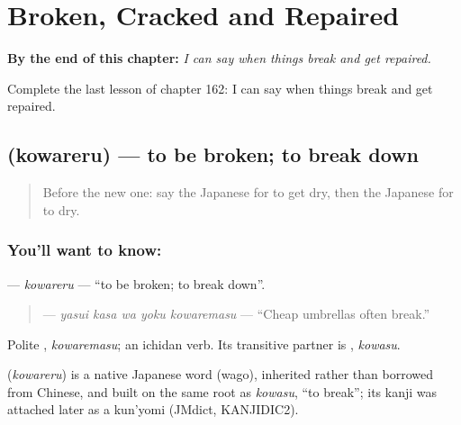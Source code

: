 
\chapter{Broken, Cracked and Repaired}
\label{ch:ja-broken-cracked-and-repaired}

\begin{chapteropening}
\textbf{By the end of this chapter:} \emph{I can say when things break and get repaired.}

Complete the last lesson of chapter 162: I can say when things break and get repaired.
\end{chapteropening}

\section[\texorpdfstring{\ja{こわれる} (kowareru)}{こわれる (kowareru)}]{ (kowareru) — to be broken; to break down}

\label{lesson:JA-C162-kowareru}



\begin{quote}
Before the new one: say the Japanese for to get dry, then the Japanese for to dry.
\end{quote}

\subsection*{You'll want to know: }
\textbf{} — \emph{kowareru} — \textquotedblleft{}to be broken; to break down\textquotedblright{}.

\begin{quote}
\textbf{   } — \emph{yasui kasa wa yoku kowaremasu} — \textquotedblleft{}Cheap umbrellas often break.\textquotedblright{}
\end{quote}

Polite \textbf{}, \emph{kowaremasu}; an ichidan verb. Its transitive partner is \textbf{}, \emph{kowasu}.

\begin{cousinweb}
\textbf{} (\emph{kowareru}) is a native Japanese word (wago), inherited rather than borrowed from Chinese, and built on the same root as \emph{kowasu}, \textquotedblleft{}to break\textquotedblright{}; its kanji was attached later as a kun'yomi (JMdict, KANJIDIC2).
\end{cousinweb}

